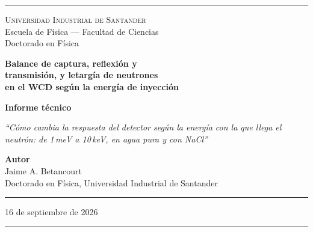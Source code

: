 \documentclass[11pt,a4paper]{article}
\begin{document}
\pagestyle{empty}


\begin{titlepage}
\begin{center}

\vspace*{0.5cm}
\textcolor{reglaColor}{\rule{\linewidth}{1.2pt}}

\vspace{1.3cm}
{\Large\scshape Universidad Industrial de Santander}\\[0.2cm]
{\large Escuela de Física --- Facultad de Ciencias}\\[0.2cm]
{\large Doctorado en Física}

\vspace{2.2cm}
{\Huge\bfseries\color{tituloColor} Balance de captura, reflexión y\\[0.2cm]
transmisión, y letargía de neutrones\\[0.2cm] en el WCD según la energía de inyección}

\vspace{1.8cm}
{\large\textbf{Informe técnico}}

\vspace{0.6cm}
\begin{minipage}{0.82\linewidth}
\centering
\textit{``Cómo cambia la respuesta del detector según la energía con la que llega el neutrón: de 1\,meV a 10\,keV, en agua pura y con NaCl''}
\end{minipage}

\vfill

{\large\textbf{Autor}}\\[0.15cm]
Jaime A. Betancourt\\[0.1cm]
Doctorado en Física, Universidad Industrial de Santander

\vspace{1.2cm}
\textcolor{reglaColor}{\rule{0.5\linewidth}{0.6pt}}

\vspace{1cm}
16 de septiembre de 2026

\vspace{1cm}
\textcolor{reglaColor}{\rule{\linewidth}{1.2pt}}

\end{center}
\end{titlepage}

\pagestyle{plain}
\end{document}
